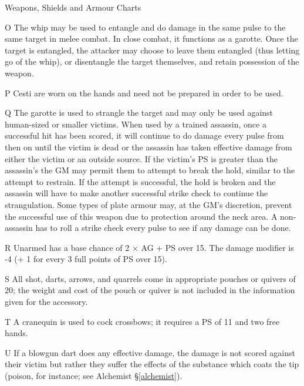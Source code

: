 \begin{Tables}{Weapons, Shields and Armour Charts}
\begin{multicols}{2}
\begin{Description}
\item[O] The whip may be used to entangle and do damage in the same
  pulse to the same target in melee combat.  In close combat, it
  functions as a garotte.  Once the target is entangled, the attacker
  may choose to leave them entangled (thus letting go of the whip), or
  disentangle the target themselves, and retain possession of the
  weapon.

\item[P] Cesti are worn on the hands and need not be prepared in order
  to be used.

\item[Q] The garotte is used to strangle the target and may only be
  used against human-sized or smaller victims.  When used by a trained
  assassin, once a successful hit has been scored, it will continue to
  do damage every pulse from then on until the victim is dead or the
  assassin has taken effective damage from either the victim or an
  outside source.  If the victim’s PS is greater than the assassin’s
  the GM may permit them to attempt to break the hold, similar to the
  attempt to restrain.  If the attempt is successful, the hold is
  broken and the assassin will have to make another successful strike
  check to continue the strangulation.  Some types of plate armour
  may, at the GM’s discretion, prevent the successful use of this
  weapon due to protection around the neck area.  A non-assassin has
  to roll a strike check every pulse to see if any damage can be done.

\item[R] Unarmed has a base chance of 2 × AG + PS over 15. The damage
  modifier is -4 (+ 1 for every 3 full points of PS over 15).

\item[S] All shot, darts, arrows, and quarrels come in appropriate
pouches or quivers of 20; the weight and cost of the pouch or quiver
is not included in the information given for the accessory.

\item[T] A cranequin is used to cock crossbows; it requires a PS of
  11 and two free hands.

\item[U] If a blowgun dart does any effective damage, the damage is
  not scored against their victim but rather they suffer the effects
  of the substance which coats the tip (poison, for instance; see
  Alchemist \S\ref{alchemist}).
\end{Description}
\end{multicols}


\end{Tables}
